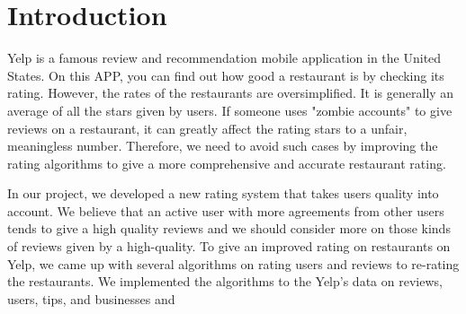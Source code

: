 \documentclass{stylefiles/capstone}
\begin{document}
\section{Introduction}
Yelp is a famous review and recommendation mobile application in the United States. On this APP, you can find out how good a restaurant is by checking its rating. However, the rates of the restaurants are oversimplified. It is generally an average of all the stars given by users. If someone uses "zombie accounts" to give reviews on a restaurant, it can greatly affect the rating stars to a unfair, meaningless number. Therefore, we need to avoid such cases by improving the rating algorithms to give a more comprehensive and accurate restaurant rating. 

In our project, we developed a new rating system that takes users quality into account. We believe that an active user with more agreements from other users tends to give a high quality reviews and we should consider more on those kinds of reviews given by a high-quality. To give an improved rating on restaurants on Yelp, we came up with several algorithms on rating users and reviews to re-rating the restaurants. We implemented the algorithms to the Yelp's data on reviews, users, tips, and businesses and 
\end{document}
